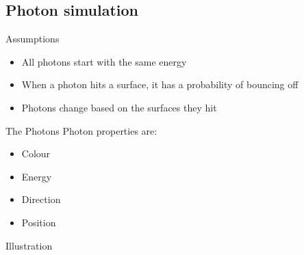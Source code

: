 \documentclass{beamer}
\begin{document}
		\subsection{Photon simulation}
			\begin{frame}{Assumptions}
				\begin{itemize}
					\item<2-> All photons start with the same energy
					\item<3-> When a photon hits a surface, it has a probability of bouncing off
					\item<4-> Photons change based on the surfaces they hit
				\end{itemize}
			\end{frame}
			\begin{frame}{The Photons}
				Photon properties are:
				\begin{itemize}
					\item<2-> Colour
					\item<3-> Energy
					\item<4-> Direction
					\item<4-> Position
				\end{itemize}
			\end{frame}
			\begin{frame}{Illustration}\end{frame}
\end{document}
